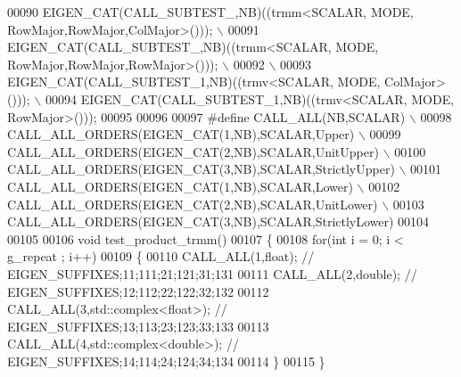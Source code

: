 \begin{DoxyCode}
00090 \textcolor{preprocessor}{  EIGEN\_CAT(CALL\_SUBTEST\_,NB)((trmm<SCALAR, MODE, RowMajor,RowMajor,ColMajor>()));  \(\backslash\)}
00091 \textcolor{preprocessor}{  EIGEN\_CAT(CALL\_SUBTEST\_,NB)((trmm<SCALAR, MODE, RowMajor,RowMajor,RowMajor>()));  \(\backslash\)}
00092 \textcolor{preprocessor}{  \(\backslash\)}
00093 \textcolor{preprocessor}{  EIGEN\_CAT(CALL\_SUBTEST\_1,NB)((trmv<SCALAR, MODE, ColMajor>()));                   \(\backslash\)}
00094 \textcolor{preprocessor}{  EIGEN\_CAT(CALL\_SUBTEST\_1,NB)((trmv<SCALAR, MODE, RowMajor>()));}
00095 
00096   
00097 \textcolor{preprocessor}{#define CALL\_ALL(NB,SCALAR)                 \(\backslash\)}
00098 \textcolor{preprocessor}{  CALL\_ALL\_ORDERS(EIGEN\_CAT(1,NB),SCALAR,Upper)          \(\backslash\)}
00099 \textcolor{preprocessor}{  CALL\_ALL\_ORDERS(EIGEN\_CAT(2,NB),SCALAR,UnitUpper)      \(\backslash\)}
00100 \textcolor{preprocessor}{  CALL\_ALL\_ORDERS(EIGEN\_CAT(3,NB),SCALAR,StrictlyUpper)  \(\backslash\)}
00101 \textcolor{preprocessor}{  CALL\_ALL\_ORDERS(EIGEN\_CAT(1,NB),SCALAR,Lower)          \(\backslash\)}
00102 \textcolor{preprocessor}{  CALL\_ALL\_ORDERS(EIGEN\_CAT(2,NB),SCALAR,UnitLower)      \(\backslash\)}
00103 \textcolor{preprocessor}{  CALL\_ALL\_ORDERS(EIGEN\_CAT(3,NB),SCALAR,StrictlyLower)}
00104   
00105 
00106 \textcolor{keywordtype}{void} test\_product\_trmm()
00107 \{
00108   \textcolor{keywordflow}{for}(\textcolor{keywordtype}{int} i = 0; i < g\_repeat ; i++)
00109   \{
00110     CALL\_ALL(1,\textcolor{keywordtype}{float});                \textcolor{comment}{//  EIGEN\_SUFFIXES;11;111;21;121;31;131}
00111     CALL\_ALL(2,\textcolor{keywordtype}{double});               \textcolor{comment}{//  EIGEN\_SUFFIXES;12;112;22;122;32;132}
00112     CALL\_ALL(3,std::complex<float>);  \textcolor{comment}{//  EIGEN\_SUFFIXES;13;113;23;123;33;133}
00113     CALL\_ALL(4,std::complex<double>); \textcolor{comment}{//  EIGEN\_SUFFIXES;14;114;24;124;34;134}
00114   \}
00115 \}
\end{DoxyCode}
